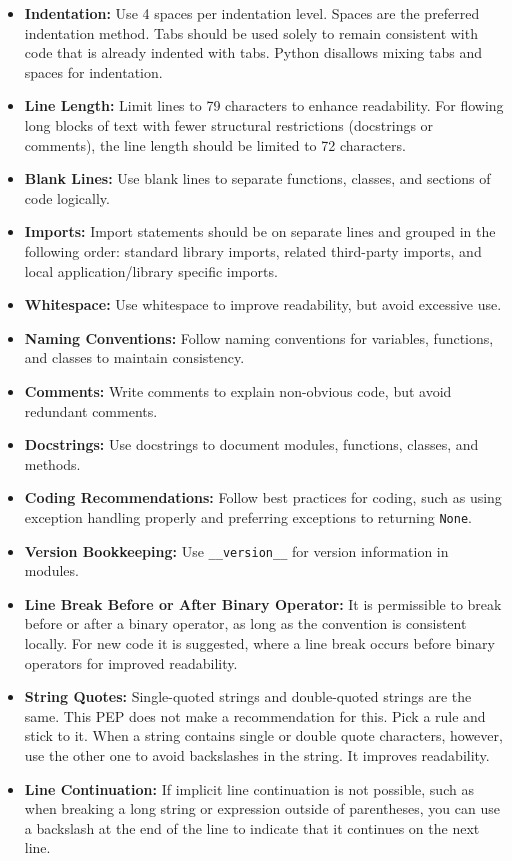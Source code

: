 \begin{itemize}
    \item \textbf{Indentation:} Use 4 spaces per indentation level. Spaces are the preferred indentation method. Tabs should be used solely to remain consistent with code that is already indented with tabs. Python disallows mixing tabs and spaces for indentation.
    \item \textbf{Line Length:} Limit lines to 79 characters to enhance readability. For flowing long blocks of text with fewer structural restrictions (docstrings or comments), the line length should be limited to 72 characters.
    \item \textbf{Blank Lines:} Use blank lines to separate functions, classes, and sections of code logically.
    \item \textbf{Imports:} Import statements should be on separate lines and grouped in the following order: standard library imports, related third-party imports, and local application/library specific imports.
    \item \textbf{Whitespace:} Use whitespace to improve readability, but avoid excessive use.
    \item \textbf{Naming Conventions:} Follow naming conventions for variables, functions, and classes to maintain consistency.
    \item \textbf{Comments:} Write comments to explain non-obvious code, but avoid redundant comments.
    \item \textbf{Docstrings:} Use docstrings to document modules, functions, classes, and methods.
    \item \textbf{Coding Recommendations:} Follow best practices for coding, such as using exception handling properly and preferring exceptions to returning \texttt{None}.
    \item \textbf{Version Bookkeeping:} Use \texttt{\_\_version\_\_} for version information in modules.
        \item \textbf{Line Break Before or After Binary Operator:} It is permissible to break before or after a binary operator, as long as the convention is consistent locally. For new code it is suggested, where a line break occurs before binary operators for improved readability.
    \item \textbf{String Quotes:} Single-quoted strings and double-quoted strings are the same. This PEP does not make a recommendation for this. Pick a rule and stick to it. When a string contains single or double quote characters, however, use the other one to avoid backslashes in the string. It improves readability.
    \item \textbf{Line Continuation:} If implicit line continuation is not possible, such as when breaking a long string or expression outside of parentheses, you can use a backslash at the end of the line to indicate that it continues on the next line.
\end{itemize}

